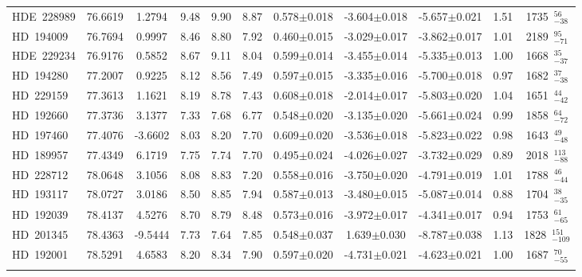 {\begin{longtable}{lcccccccccc}
\noalign{\smallskip}
HDE~228989 & 76.6619 & 1.2794 & 9.48 & 9.90 & 8.87 & 0.578$\pm$0.018 & -3.604$\pm$0.018 & -5.657$\pm$0.021 & 1.51 & 1735~$_{-38}^{56}$ \\
\noalign{\smallskip}
HD~194009 & 76.7694 & 0.9997 & 8.46 & 8.80 & 7.92 & 0.460$\pm$0.015 & -3.029$\pm$0.017 & -3.862$\pm$0.017 & 1.01 & 2189~$_{-71}^{95}$ \\
\noalign{\smallskip}
HDE~229234 & 76.9176 & 0.5852 & 8.67 & 9.11 & 8.04 & 0.599$\pm$0.014 & -3.455$\pm$0.014 & -5.335$\pm$0.013 & 1.00 & 1668~$_{-37}^{35}$ \\
\noalign{\smallskip}
HD~194280 & 77.2007 & 0.9225 & 8.12 & 8.56 & 7.49 & 0.597$\pm$0.015 & -3.335$\pm$0.016 & -5.700$\pm$0.018 & 0.97 & 1682~$_{-38}^{37}$ \\
\noalign{\smallskip}
HD~229159 & 77.3613 & 1.1621 & 8.19 & 8.78 & 7.43 & 0.608$\pm$0.018 & -2.014$\pm$0.017 & -5.803$\pm$0.020 & 1.04 & 1651~$_{-42}^{44}$ \\
\noalign{\smallskip}
HD~192660 & 77.3736 & 3.1377 & 7.33 & 7.68 & 6.77 & 0.548$\pm$0.020 & -3.135$\pm$0.020 & -5.661$\pm$0.024 & 0.99 & 1858~$_{-72}^{64}$ \\
\noalign{\smallskip}
HD~197460 & 77.4076 & -3.6602 & 8.03 & 8.20 & 7.70 & 0.609$\pm$0.020 & -3.536$\pm$0.018 & -5.823$\pm$0.022 & 0.98 & 1643~$_{-48}^{49}$ \\
\noalign{\smallskip}
HD~189957 & 77.4349 & 6.1719 & 7.75 & 7.74 & 7.70 & 0.495$\pm$0.024 & -4.026$\pm$0.027 & -3.732$\pm$0.029 & 0.89 & 2018~$_{-88}^{113}$ \\
\noalign{\smallskip}
HD~228712 & 78.0648 & 3.1056 & 8.08 & 8.83 & 7.20 & 0.558$\pm$0.016 & -3.750$\pm$0.020 & -4.791$\pm$0.019 & 1.01 & 1788~$_{-44}^{46}$ \\
\noalign{\smallskip}
HD~193117 & 78.0727 & 3.0186 & 8.50 & 8.85 & 7.94 & 0.587$\pm$0.013 & -3.480$\pm$0.015 & -5.087$\pm$0.014 & 0.88 & 1704~$_{-35}^{38}$ \\
\noalign{\smallskip}
HD~192039 & 78.4137 & 4.5276 & 8.70 & 8.79 & 8.48 & 0.573$\pm$0.016 & -3.972$\pm$0.017 & -4.341$\pm$0.017 & 0.94 & 1753~$_{-65}^{61}$ \\
\noalign{\smallskip}
HD~201345 & 78.4363 & -9.5444 & 7.73 & 7.64 & 7.85 & 0.548$\pm$0.037 & 1.639$\pm$0.030 & -8.787$\pm$0.038 & 1.13 & 1828~$_{-109}^{151}$ \\
\noalign{\smallskip}
HD~192001 & 78.5291 & 4.6583 & 8.20 & 8.34 & 7.90 & 0.597$\pm$0.020 & -4.731$\pm$0.021 & -4.623$\pm$0.021 & 1.00 & 1687~$_{-55}^{70}$ \\
\noalign{\smallskip}

\end{longtable}}
